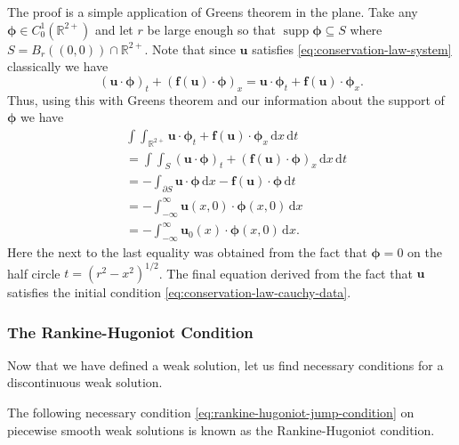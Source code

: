 \begin{Proof}
The proof is a simple application of Green\textquotesingle s theorem in the plane. Take any $\bm{\phi}\in C_0^1(\mathbb{R}^{2+})$ and let $r$ be large enough so that $\operatorname{supp}\bm{\phi}\subseteq S$ where $S=B_r((0,0))\cap\mathbb{R}^{2+}$. Note that since $\bm{u}$ satisfies \eqref{eq:conservation-law-system} classically we have
\begin{equation}\label{eq:conservation-classical-product-identity}
(\bm{u}\cdot\bm{\phi})_t+(\bm{f}(\bm{u})\cdot\bm{\phi})_x=\bm{u}\cdot\bm{\phi}_t+\bm{f}(\bm{u})\cdot\bm{\phi}_x.
\end{equation}
Thus, using this with Green\textquotesingle s theorem and our information about the support of $\bm{\phi}$ we have
\[
\begin{aligned}
&\int\!\!\int_{\mathbb{R}^{2+}}\bm{u}\cdot\bm{\phi}_t+\bm{f}(\bm{u})\cdot\bm{\phi}_x\,\mathrm{d}x\,\mathrm{d}t\\
&=\int\!\!\int_S(\bm{u}\cdot\bm{\phi})_t+(\bm{f}(\bm{u})\cdot\bm{\phi})_x\,\mathrm{d}x\,\mathrm{d}t\\
&=-\int_{\partial S}\bm{u}\cdot\bm{\phi}\,\mathrm{d}x-\bm{f}(\bm{u})\cdot\bm{\phi}\,\mathrm{d}t\\
&=-\int_{-\infty}^\infty\bm{u}(x,0)\cdot\bm{\phi}(x,0)\,\mathrm{d}x\\
&=-\int_{-\infty}^\infty\bm{u}_0(x)\cdot\bm{\phi}(x,0)\,\mathrm{d}x.
\end{aligned}
\]
Here the next to the last equality was obtained from the fact that $\bm{\phi}=0$ on the half circle $t=(r^2-x^2)^{1/2}$. The final equation derived from the fact that $\bm{u}$ satisfies the initial condition \eqref{eq:conservation-law-cauchy-data}.
\end{Proof}

\subsubsection{The Rankine-Hugoniot Condition}\label{subsec:rankine-hugoniot-condition}

Now that we have defined a weak solution, let us find necessary conditions for a discontinuous weak solution.

The following necessary condition \eqref{eq:rankine-hugoniot-jump-condition} on piecewise smooth weak solutions is known as the Rankine-Hugoniot condition.

